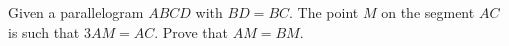 \problem
Given a parallelogram $ ABCD $ with $ BD = BC $.
The point $M$ on the segment $AC$ is such that $3 AM = AC$.
Prove that $AM = BM$.
\solution
\endproblem
